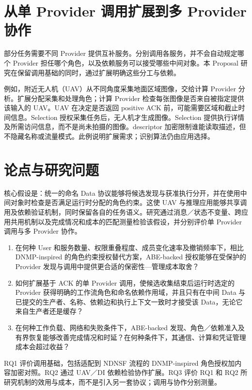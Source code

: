 

\section{从单 Provider 调用扩展到多 Provider 协作}
部分任务需要不同 Provider 提供互补服务。分别调用各服务，并不会自动规定哪个 Provider 担任哪个角色，以及依赖服务可以接受哪些中间对象。本 Proposal 研究在保留调用基础的同时，通过扩展明确这些分工与依赖。

例如，附近无人机（UAV）从不同角度采集地面区域图像，交给计算 Provider 分析。扩展分配采集和处理角色；计算 Provider 检查每张图像是否来自被指定提供该输入的 UAV。UAV 在决定是否返回 positive ACK 前，可能需要区域和截止时间信息。Selection 授权采集任务后，无人机才生成图像。Selection 提供执行详情及所需访问信息，而不是尚未拍摄的图像。descriptor 加密限制谁能读取描述，但不隐藏名称或流量模式。此例说明扩展需求；识别算法仍由应用选择。

\section{论点与研究问题}
核心假设是：统一的命名 Data 协议能够将候选发现与获准执行分开，并在使用中间对象时检查是否满足运行时分配的角色约束。这使 UAV 与推理应用能够共享调用及依赖验证机制，同时保留各自的任务语义。研究通过消息／状态不变量、跨应用共用机制以及完成情况和成本的匹配测量检验该假设，并分别评价单 Provider 调用与多 Provider 协作。
\begin{enumerate}[label=RQ\arabic*.,leftmargin=*]
\item 在何种 User 和服务数量、权限重叠程度、成员变化速率及撤销频率下，相比 DNMP-inspired 的角色约束授权替代方案，ABE-backed 授权能够在受保护的 Provider 发现与调用中提供更合适的保密性—管理成本取舍？
\item 如何扩展基于 ACK 的单 Provider 调用，使候选收集结束后运行时选定的 Provider 获得明确的工作流角色和命名依赖作用域，并且只有在中间 Data 与已提交的生产者、名称、依赖边和执行上下文一致时才接受该 Data，无论它来自生产者还是缓存？
\item 在何种工作负载、网络和失败条件下，ABE-backed 发现、角色／依赖准入及有界恢复能够改善完成情况和时延？在何种条件下，其通信、计算和凭证管理成本会超过收益？
\end{enumerate}
RQ1 评价调用基础，包括适配到 NDNSF 流程的 DNMP-inspired 角色授权加内容加密对照。RQ2 通过 UAV／DI 依赖检验协作扩展。RQ3 评价 RQ1 和 RQ2 所研究机制的效用与成本，而不是引入另一套协议；调用与协作分别测量。

